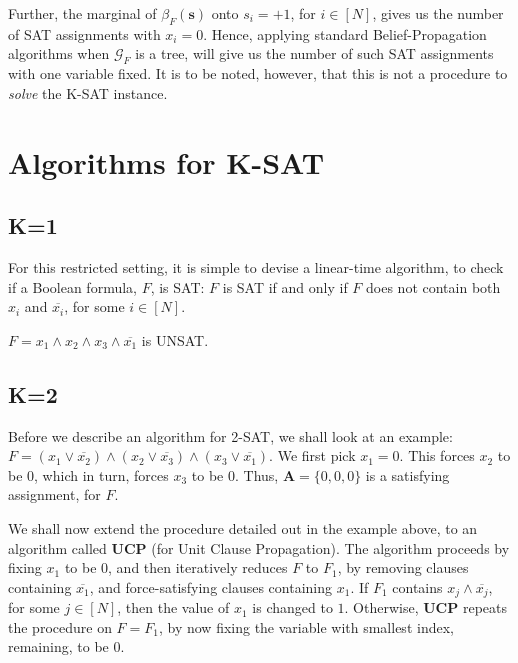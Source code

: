 \documentclass[letterpaper,english,11pt]{article}
\begin{document}
Further, the marginal of $\beta_{F}(\mathbf{s})$ onto $s_i=+1$, for $i\in [N]$, gives us the number of SAT assignments with $x_i = 0$. Hence, applying standard Belief-Propagation algorithms when $\mathscr{G}_{F}$ is a tree, will give us the number of such SAT assignments with one variable fixed. It is to be noted, however, that this is not a procedure to \textit{solve} the K-SAT instance.

\section{Algorithms for K-SAT}
\subsection{K=1}
For this restricted setting, it is simple to devise a linear-time algorithm, to check if a Boolean formula, $F$, is SAT: $F$ is SAT if and only if $F$ does not contain both $x_i$ and $\overline{x_i}$, for some $i\in [N]$.

\begin{shaded*}
\begin{exmp}
$F = x_1\wedge x_2\wedge x_3\wedge \overline{x_1}$ is UNSAT.
\end{exmp}
\end{shaded*}
\subsection{K=2}

\begin{shaded*}
\begin{exmp}
Before we describe an algorithm for 2-SAT, we shall look at an example: $F=(x_1\vee \overline{x_2})\wedge(x_2\vee \overline{x_3})\wedge(x_3\vee \overline{x_1})$. We first pick $x_1=0$. This forces $x_2$ to be $0$, which in turn, forces $x_3$ to be $0$. Thus, $\mathbf{A} = \{0,0,0\}$ is a satisfying assignment, for $F$.
\end{exmp}
\end{shaded*}

We shall now extend the procedure detailed out in the example above, to an algorithm called \textbf{UCP} (for Unit Clause Propagation). The algorithm proceeds by fixing $x_1$ to be $0$, and then iteratively reduces $F$ to $F_1$, by removing clauses containing $\overline{x_1}$, and force-satisfying clauses containing $x_1$. If $F_1$ contains $x_j\wedge \overline{x_j}$, for some $j\in [N]$, then the value of $x_1$ is changed to $1$. Otherwise, \textbf{UCP} repeats the procedure on $F=F_1$, by now fixing the variable with smallest index, remaining, to be $0$.
\end{document}
